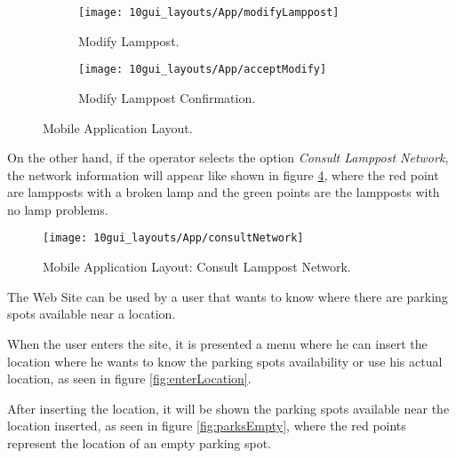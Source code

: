 \begin{figure}[H]
	\centering
	\begin{subfigure}{.5\textwidth}
		\centering
		\texttt{[image: 10gui\_layouts/App/modifyLamppost]}
		\caption{Modify Lamppost.}
		\label{fig:modifyLamppost}
	\end{subfigure}%
	\begin{subfigure}{.5\textwidth}
		\centering
		\texttt{[image: 10gui\_layouts/App/acceptModify]}
		\caption{Modify Lamppost Confirmation.}
		\label{fig:acceptModify}
	\end{subfigure}
	\caption{Mobile Application Layout.}
	\label{fig:App2}
\end{figure}

\clearpage
On the other hand, if the operator selects the option \textit{Consult Lamppost Network}, the network information will appear like shown in figure \ref{fig:consultNetwork}, where the red point are lampposts with a broken lamp and the green points are the lampposts with no lamp problems.

\begin{figure}[H]
	\centering	
	\texttt{[image: 10gui\_layouts/App/consultNetwork]}
	\caption{Mobile Application Layout: Consult Lamppost Network.}
	\label{fig:consultNetwork}
\end{figure}

\clearpage
{}

The Web Site can be used by a user that wants to know where there are parking spots available near a location. 

When the user enters the site, it is presented a menu where he can insert the location where he wants to know the parking spots availability or use his actual location, as seen in figure \ref{fig:enterLocation}.


After inserting the location, it will be shown the parking spots available near the location inserted, as seen in figure \ref{fig:parksEmpty}, where the red points represent the location of an empty parking spot.



